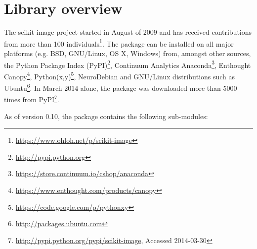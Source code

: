
\section*{Library overview}
  \label{library-contents}

  The scikit-image project started in August of 2009 and has received contributions from more than 100 individuals\footnote{\url{https://www.ohloh.net/p/scikit-image}}.  The package can be installed on all major platforms (e.g. BSD, GNU/Linux, OS X, Windows) from, amongst other sources, the Python Package Index (PyPI)\footnote{\url{http://pypi.python.org}}, Continuum Analytics Anaconda\footnote{\url{https://store.continuum.io/cshop/anaconda}}, Enthought Canopy\footnote{\url{https://www.enthought.com/products/canopy}}, Python(x,y)\footnote{\url{https://code.google.com/p/pythonxy}}, NeuroDebian \citep{neurodebian} and GNU/Linux distributions such as Ubuntu\footnote{\url{http://packages.ubuntu.com}}. In March 2014 alone, the package was downloaded more than 5000 times from PyPI\footnote{\url{http://pypi.python.org/pypi/scikit-image}, Accessed 2014-03-30}.

  As of version 0.10, the package contains the following sub-modules:

